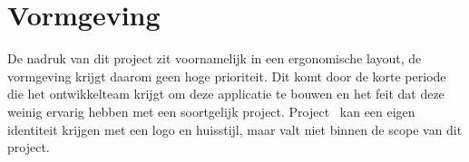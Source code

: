\chapter{Vormgeving} \label{cha:vormgeving}

De nadruk van dit project zit voornamelijk in een ergonomische layout, de vormgeving krijgt daarom geen hoge prioriteit. Dit komt door de korte periode die het ontwikkelteam krijgt om deze applicatie te bouwen en het feit dat deze weinig ervarig hebben met een soortgelijk project. Project \projectname\ kan een eigen identiteit krijgen met een logo en huisstijl, maar valt niet binnen de scope van dit project. 
